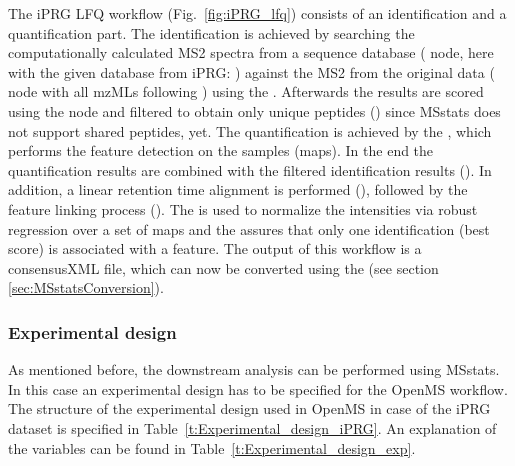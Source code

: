 \noindent The iPRG LFQ workflow (Fig.~\ref{fig:iPRG_lfq}) consists of an identification and a quantification part. The identification is achieved by searching the computationally calculated MS2 spectra from a sequence database ( node, here with the given database from iPRG:
)
against the MS2 from the original data ( node with all mzMLs following ) using the .
Afterwards the results are scored using the  node and filtered to obtain only unique peptides () since MSstats does not support shared peptides, yet. The quantification is achieved by the , which performs the feature detection on the samples (maps). In the end the quantification results are combined with the filtered identification results (). In addition, a linear retention time alignment is performed (), followed by the feature linking process (). The  is used to normalize the intensities via robust regression over a set of maps and the  assures that only one identification (best score) is associated with a feature. The output of this workflow is a consensusXML file, which can now be converted using the  (see section \ref{sec:MSstatsConversion}). 

\subsubsection{Experimental design}
\noindent As mentioned before, the downstream analysis can be performed using MSstats. In this case an experimental design has to be specified for the OpenMS workflow. The structure of the experimental design used in OpenMS in case of the iPRG dataset is specified in Table~\ref{t:Experimental_design_iPRG}. An explanation of the variables can be found in Table~\ref{t:Experimental_design_exp}. 


